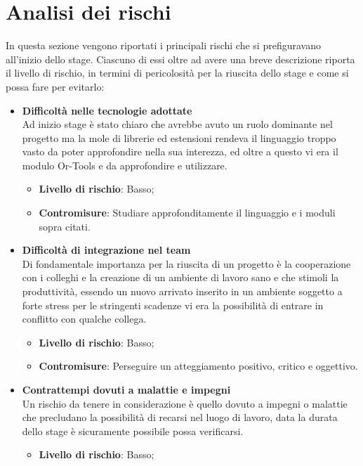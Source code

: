 \section{Analisi dei rischi}
In questa sezione vengono riportati i principali rischi che si prefiguravano all'inizio dello stage. Ciascuno di essi oltre ad avere una breve descrizione riporta il livello di rischio, in termini di pericolosità per la riuscita dello stage e come si possa fare per evitarlo:
\begin{itemize}
	\item \textbf{Difficoltà nelle tecnologie adottate}\\
	      Ad inizio stage è stato chiaro che  avrebbe avuto un ruolo dominante nel progetto ma la mole di librerie ed estensioni rendeva il linguaggio troppo vasto da poter approfondire nella sua interezza, ed oltre a questo vi era il modulo Or-Tools e  da approfondire e utilizzare.
	      \begin{itemize}
	      	\item \textbf{Livello di rischio}: Basso;
	      	\item \textbf{Contromisure}: Studiare approfonditamente il linguaggio  e i moduli sopra citati.
	      \end{itemize}
	\item \textbf{Difficoltà di integrazione nel team}\\
	      Di fondamentale importanza per la riuscita di un progetto è la cooperazione con i colleghi e la creazione di un ambiente di lavoro sano e che stimoli la produttività, essendo un nuovo arrivato inserito in un ambiente soggetto a forte stress per le stringenti scadenze vi era la possibilità di entrare in conflitto con qualche collega.
	      \begin{itemize}
	      	\item \textbf{Livello di rischio}: Basso;
	      	\item \textbf{Contromisure}: Perseguire un atteggiamento positivo, critico e oggettivo.
	      \end{itemize}
	\item \textbf{Contrattempi dovuti a malattie e impegni}\\
	      Un rischio da tenere in considerazione è quello dovuto a impegni o malattie che precludano la possibilità di recarsi nel luogo di lavoro, data la durata dello stage è sicuramente possibile possa verificarsi.
	      \begin{itemize}
	      	\item \textbf{Livello di rischio}: Basso;

\end{itemize}
\end{itemize}
